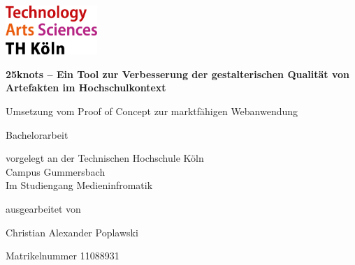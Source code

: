 \begin{titlepage}

\begin{center}

\begin{flushright}
\includegraphics[width=0.26\textwidth]{images/logo_th.jpg}
\end{flushright}

\vspace{1.6cm}

{\Large\textbf{25knots – Ein Tool zur Verbesserung der gestalterischen Qualität von Artefakten im Hochschulkontext}\par}
\vspace{0.5cm}
\begin{large}
Umsetzung vom Proof of Concept zur marktfähigen Webanwendung
\end{large}

\vspace{1.6cm}

\begin{LARGE}
\begin{scshape}
Bachelorarbeit\\
\end{scshape}
\end{LARGE}

\vspace{0.8cm}

\begin{large}
vorgelegt an der Technischen Hochschule Köln\\
Campus Gummersbach\\
Im Studiengang Medieninfromatik\\
\end{large}
\vspace{0.8cm}

ausgearbeitet von\\
\vspace{0.2cm}
\begin{large}
Christian Alexander Poplawski\\
\begin{scshape}
Matrikelnummer 11088931
\end{scshape}
\end{large}


\end{center}
\end{titlepage}
